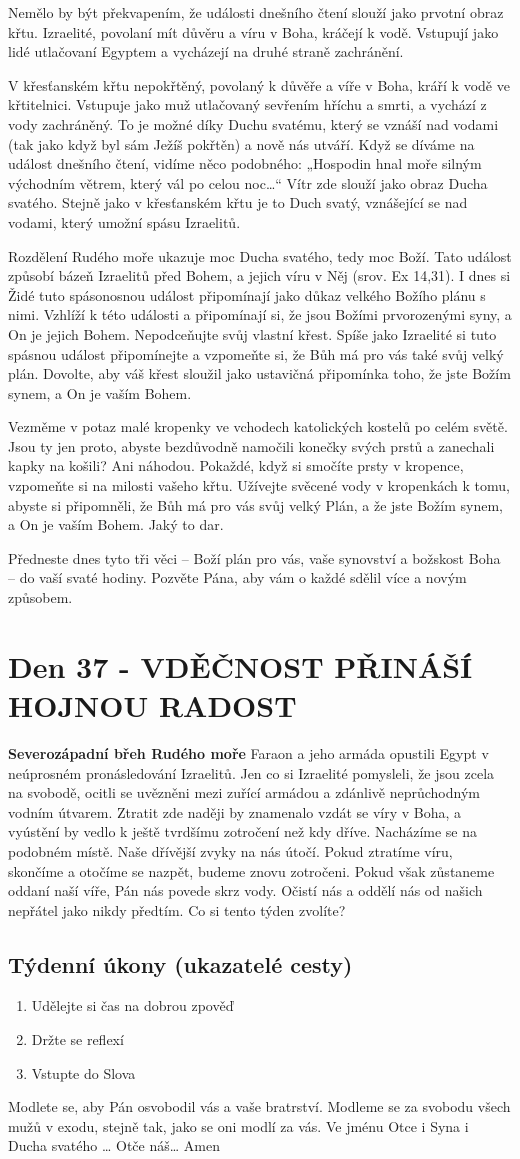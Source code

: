 \documentclass[11pt]{article}
\newcommand{\zacatekSestyTyden}{
  \textbf{Severozápadní břeh Rudého moře} \newline 
  Faraon a jeho armáda opustili Egypt v neúprosném pronásledování Izraelitů. Jen co si Izraelité pomysleli, že jsou zcela na svobodě, ocitli se uvězněni mezi zuřící armádou a zdánlivě neprůchodným vodním útvarem. Ztratit zde naději by znamenalo vzdát se víry v Boha, a vyústění by vedlo k ještě tvrdšímu zotročení než kdy dříve. Nacházíme se na podobném místě. Naše dřívější zvyky na nás útočí. Pokud ztratíme víru, skončíme a otočíme se nazpět, budeme znovu zotročeni. Pokud však zůstaneme oddaní naší víře, Pán nás povede skrz vody. Očistí nás a oddělí nás od našich nepřátel jako nikdy předtím. Co si tento týden zvolíte?

\subsection*{Týdenní úkony (ukazatelé cesty)}
\begin{enumerate}
  \item Udělejte si čas na dobrou zpověď
  \item Držte se reflexí
  \item Vstupte do Slova
\end{enumerate}
Modlete se, aby Pán osvobodil vás a vaše bratrství. \newline
Modleme se za svobodu všech mužů v exodu, stejně tak, jako se oni modlí za vás.\newline
Ve jménu Otce i Syna i Ducha svatého …  Otče náš… Amen
}
\begin{document}
Nemělo by být překvapením, že události dnešního čtení slouží jako prvotní obraz křtu. Izraelité, povolaní mít důvěru a
víru v Boha, kráčejí k vodě. Vstupují jako lidé utlačovaní Egyptem a vycházejí na druhé straně zachránění.

V křesťanském křtu nepokřtěný, povolaný k důvěře a víře v Boha, kráří k vodě ve křtitelnici. Vstupuje jako muž
utlačovaný sevřením hříchu a smrti, a vychází z vody zachráněný. To je možné díky Duchu svatému, který se vznáší
nad vodami (tak jako když byl sám Ježíš pokřtěn) a nově nás utváří. Když se díváme na událost dnešního čtení, vidíme
něco podobného: „Hospodin hnal moře silným východním větrem, který vál po celou noc…“ Vítr zde slouží jako obraz
Ducha svatého. Stejně jako v křesťanském křtu je to Duch svatý, vznášející se nad vodami, který umožní spásu
Izraelitů.

Rozdělení Rudého moře ukazuje moc Ducha svatého, tedy moc Boží. Tato událost způsobí bázeň Izraelitů před
Bohem, a jejich víru v Něj (srov. Ex 14,31). I dnes si Židé tuto spásonosnou událost připomínají jako důkaz velkého
Božího plánu s nimi. Vzhlíží k této události a připomínají si, že jsou Božími prvorozenými syny, a On je jejich Bohem.
Nepodceňujte svůj vlastní křest. Spíše jako Izraelité si tuto spásnou událost připomínejte a vzpomeňte si, že Bůh má
pro vás také svůj velký plán. Dovolte, aby váš křest sloužil jako ustavičná připomínka toho, že jste Božím synem, a On
je vaším Bohem.

Vezměme v potaz malé kropenky ve vchodech katolických kostelů po celém světě. Jsou ty jen proto, abyste
bezdůvodně namočili konečky svých prstů a zanechali kapky na košili? Ani náhodou. Pokaždé, když si smočíte prsty
v kropence, vzpomeňte si na milosti vašeho křtu. Užívejte svěcené vody v kropenkách k tomu, abyste si připomněli, že
Bůh má pro vás svůj velký Plán, a že jste Božím synem, a On je vaším Bohem. Jaký to dar.

Předneste dnes tyto tři věci – Boží plán pro vás, vaše synovství a božskost Boha – do vaší svaté hodiny. Pozvěte Pána,
aby vám o každé sdělil více a novým způsobem.

\newpage
\section{Den 37 - VDĚČNOST PŘINÁŠÍ HOJNOU RADOST}
\zacatekSestyTyden
\end{document}
